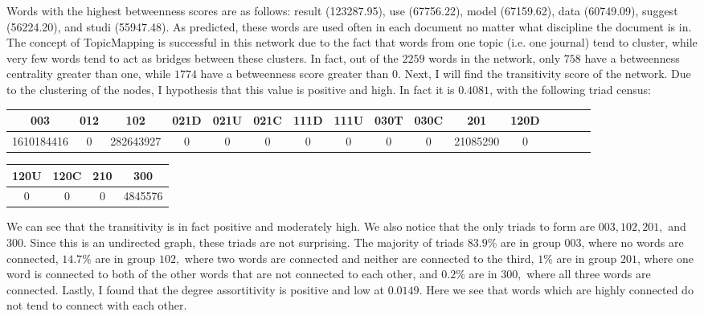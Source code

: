 \documentclass[12pt]{article}
\begin{document}
Words with the highest betweenness scores are as follows:  result (123287.95), use (67756.22), model (67159.62), data (60749.09), suggest (56224.20), and studi (55947.48). As predicted, these words are used often in each document no matter what discipline the document is in. The concept of TopicMapping is successful in this network due to the fact that words from one topic (i.e. one journal) tend to cluster, while very few words tend to act as bridges between these clusters. In fact, out of the $2259$ words in the network, only $758$ have a betweenness centrality greater than one, while $1774$ have a betweenness score greater than $0$. Next, I will find the transitivity score of the network. Due to the clustering of the nodes, I hypothesis that this value is positive and high. In fact it is $0.4081$, with the following triad census:
	\vspace{2mm}
	\begin{center}
		\begin{tabular}{ ||c|c|c|c|c|c|c|c|c|c|c|c|c|c|c|c||  }
			\hline
			 003&012&102&021D&021U&021C&111D&111U&030T&030C&201&120D \\ 
			\hline 
			1610184416&0&282643927&0&0&0&0&0&0&0&21085290&0\\
			\hline
		\end{tabular}
	\end{center}
	\begin{flushleft}
		\begin{tabular}{||c|c|c|c||}
			\hline
			120U&120C&210&300\\
			\hline
			0&0&0&4845576 \\
			\hline
		\end{tabular}
	\end{flushleft}
	\vspace{2mm}
\noindent We can see that the transitivity is in fact positive and moderately high. We also notice that the only triads to form are $003, 102, 201,$ and $300.$ Since this is an undirected graph, these triads are not surprising. The majority of triads $83.9\%$ are in group $003$, where no words are connected, $14.7\%$ are in group $102,$ where two words are connected and neither are connected to the third, $1\%$ are in group $201$, where one word is connected to both of the other words that are not connected to each other, and $0.2\%$ are in $300,$ where all three words are connected. Lastly, I found that the degree assortitivity is positive and low at $0.0149$. Here we see that words which are highly connected do not tend to connect with each other. 
  
\end{document}
